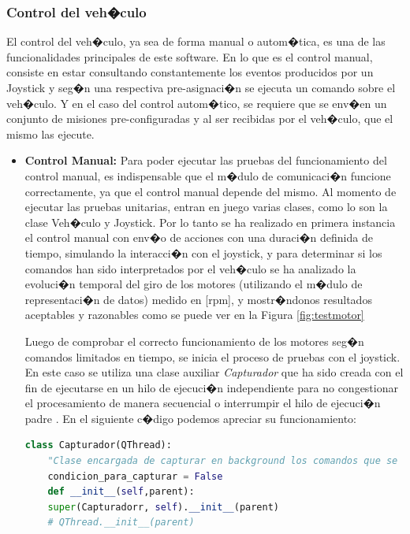 \subsubsection{Control del veh�culo}

El control del veh�culo, ya sea de forma manual o autom�tica, es una de las funcionalidades principales de este software. En lo que es el control manual, consiste en estar consultando constantemente los eventos producidos por un Joystick y seg�n una respectiva pre-asignaci�n se ejecuta un comando sobre el veh�culo. Y en el caso del control autom�tico, se requiere que se env�en un conjunto de misiones pre-configuradas y al ser recibidas por el veh�culo, que el mismo las ejecute.

\begin{itemize}
	
	\item \textbf{Control Manual:} Para poder ejecutar las pruebas del funcionamiento del control manual, es indispensable que el m�dulo de comunicaci�n funcione correctamente, ya que el control manual depende del mismo. Al momento de ejecutar las pruebas unitarias, entran en juego varias clases, como lo son la clase Veh�culo y Joystick. Por lo tanto se ha realizado en primera instancia el control manual con env�o de acciones con una duraci�n definida de tiempo, simulando la interacci�n con el joystick, y para determinar si los comandos han sido interpretados por el veh�culo se ha analizado la evoluci�n temporal del giro de los motores (utilizando el m�dulo de representaci�n de datos) medido en [rpm], y mostr�ndonos resultados aceptables y razonables como se puede ver en la Figura \ref{fig:testmotor}
	
	
	Luego de comprobar el correcto funcionamiento de los motores seg�n comandos limitados en tiempo, se inicia el proceso de pruebas con el joystick. En este caso se utiliza una clase auxiliar \textit{Capturador} que ha sido creada con el fin de ejecutarse en un hilo de ejecuci�n independiente para no congestionar el procesamiento de manera secuencial o interrumpir el hilo de ejecuci�n padre . En el siguiente c�digo podemos apreciar su funcionamiento:
	
	
	\begin{lstlisting}[language=python]
	class Capturador(QThread):
	"Clase encargada de capturar en background los comandos que se envian del Joystick "
	condicion_para_capturar = False		
	def __init__(self,parent):
	super(Capturadorr, self).__init__(parent)
	# QThread.__init__(parent)
	

\end{lstlisting}
\end{itemize}
